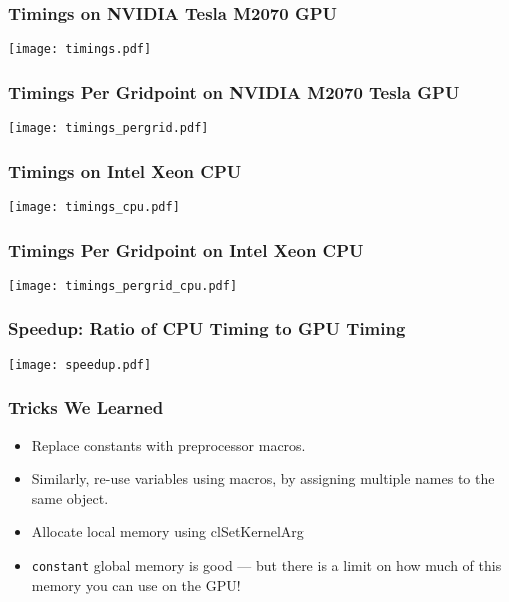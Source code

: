 \documentclass[handout]{beamer}
\theoremstyle{definition}
\begin{document}
\begin{frame}
  \frametitle{Timings on NVIDIA Tesla M2070 GPU}
	\texttt{[image: timings.pdf]}
\end{frame}

\begin{frame}
  \frametitle{Timings Per Gridpoint on NVIDIA M2070 Tesla GPU}
	\texttt{[image: timings\_pergrid.pdf]}
\end{frame}

\begin{frame}
  \frametitle{Timings on Intel Xeon CPU}
	\texttt{[image: timings\_cpu.pdf]}
\end{frame}

\begin{frame}
  \frametitle{Timings Per Gridpoint on Intel Xeon CPU}
	\texttt{[image: timings\_pergrid\_cpu.pdf]}
\end{frame}

\begin{frame}
  \frametitle{Speedup: Ratio of CPU Timing to GPU Timing}
	\texttt{[image: speedup.pdf]}
\end{frame}

\begin{frame}
  \frametitle{Tricks We Learned}
  \begin{itemize}[<+->]
  \item Replace constants with preprocessor macros.
  \item Similarly, re-use variables using macros, by assigning multiple names to the same object.
  \item Allocate local memory using clSetKernelArg
  \item \texttt{constant} global memory is good --- but there is a limit on how much of this memory you can use on the GPU!
  \end{itemize}
\end{frame}
\end{document}
